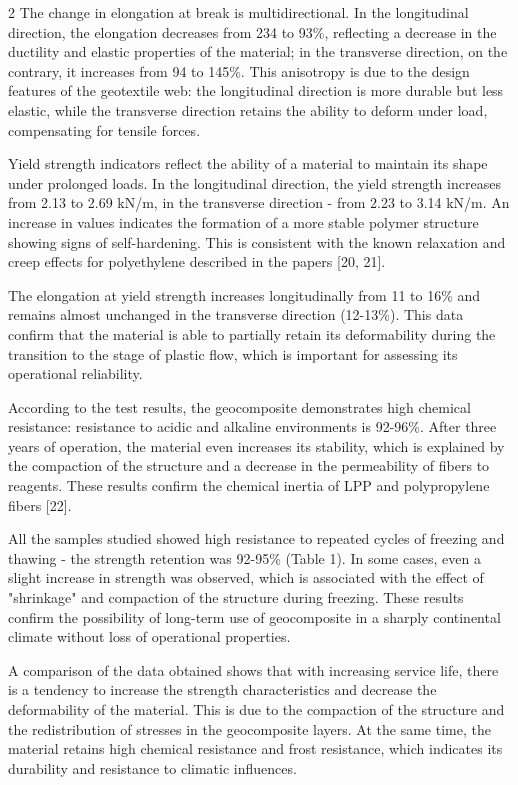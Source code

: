 \begin{multicols}{2}
The change in elongation at break is multidirectional. In the
longitudinal direction, the elongation decreases from 234 to 93\%,
reflecting a decrease in the ductility and elastic properties of the
material; in the transverse direction, on the contrary, it increases
from 94 to 145\%. This anisotropy is due to the design features of the
geotextile web: the longitudinal direction is more durable but less
elastic, while the transverse direction retains the ability to deform
under load, compensating for tensile forces.

Yield strength indicators reflect the ability of a material to maintain
its shape under prolonged loads. In the longitudinal direction, the
yield strength increases from 2.13 to 2.69 kN/m, in the transverse
direction - from 2.23 to 3.14 kN/m. An increase in values indicates the
formation of a more stable polymer structure showing signs of
self-hardening. This is consistent with the known relaxation and creep
effects for polyethylene described in the papers {[}20, 21{]}.

The elongation at yield strength increases longitudinally from 11 to
16\% and remains almost unchanged in the transverse direction (12-13\%).
This data confirm that the material is able to partially retain its
deformability during the transition to the stage of plastic flow, which
is important for assessing its operational reliability.

According to the test results, the geocomposite demonstrates high
chemical resistance: resistance to acidic and alkaline environments is
92-96\%. After three years of operation, the material even increases its
stability, which is explained by the compaction of the structure and a
decrease in the permeability of fibers to reagents. These results
confirm the chemical inertia of LPP and polypropylene fibers {[}22{]}.

All the samples studied showed high resistance to repeated cycles of
freezing and thawing - the strength retention was 92-95\% (Table 1). In
some cases, even a slight increase in strength was observed, which is
associated with the effect of "shrinkage" and compaction of the
structure during freezing. These results confirm the possibility of
long-term use of geocomposite in a sharply continental climate without
loss of operational properties.

A comparison of the data obtained shows that with increasing service
life, there is a tendency to increase the strength characteristics and
decrease the deformability of the material. This is due to the
compaction of the structure and the redistribution of stresses in the
geocomposite layers. At the same time, the material retains high
chemical resistance and frost resistance, which indicates its durability
and resistance to climatic influences.


\end{multicols}
